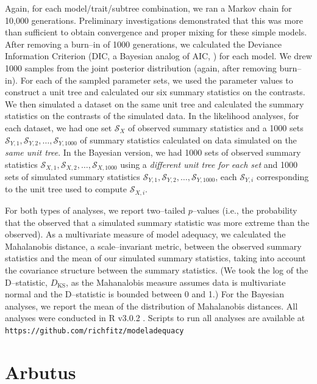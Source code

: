 \documentclass[a4paper,12pt]{article}
\begin{document}
Again, for each model/trait/subtree combination, we ran a Markov chain for 10,000 generations. Preliminary investigations demonstrated that this was more than sufficient to obtain convergence and proper mixing for these simple models. After removing a burn--in of 1000 generations, we calculated the Deviance Information Criterion (DIC, a Bayesian analog of AIC, \citep{dic}) for each model. We drew 1000 samples from the joint posterior distribution (again, after removing burn--in). For each of the sampled parameter sets, we used the parameter values to construct a unit tree and calculated our six summary statistics on the contrasts. We then simulated a dataset on the same unit tree and calculated the summary statistics on the contrasts of the simulated data. In the likelihood analyses, for each dataset, we had one set $\mathcal{S}_X$ of observed summary statistics and a 1000 sets $\mathcal{S}_{Y,1}, \mathcal{S}_{Y,2}, \ldots, \mathcal{S}_{Y,1000}$ of summary statistics calculated on data simulated on the \emph{same unit tree}. In the Bayesian version, we had 1000 sets of observed summary statistics $\mathcal{S}_{X,1}, \mathcal{S}_{X,2}, \ldots, \mathcal{S}_{X,1000}$ using a \emph{different unit tree for each set} and 1000 sets of simulated summary statistics $\mathcal{S}_{Y,1}, \mathcal{S}_{Y,2}, \ldots, \mathcal{S}_{Y,1000}$, each $\mathcal{S}_{Y,i}$ corresponding to the unit tree used to compute $\mathcal{S}_{X,i}$.
 
For both types of analyses, we report two--tailed $p$--values (i.e., the probability that the observed that a simulated summary statistic was more extreme than the observed). As a multivariate measure of model adequacy, we calculated the Mahalanobis distance, a scale--invariant metric, between the observed summary statistics and the mean of our simulated summary statistics, taking into account the covariance structure between the summary statistics. (We took the log of the  D--statistic, $D_{\text{KS}}$, as the Mahanalobis measure assumes data is multivariate normal and the D--statistic is bounded between 0 and 1.) For the Bayesian analyses, we report the mean of the distribution of Mahalanobis distances. All analyses were conducted in R v3.0.2 \citep{R}. Scripts to run all analyses are available at \texttt{https://github.com/richfitz/modeladequacy}

\section{Arbutus}
\end{document}
